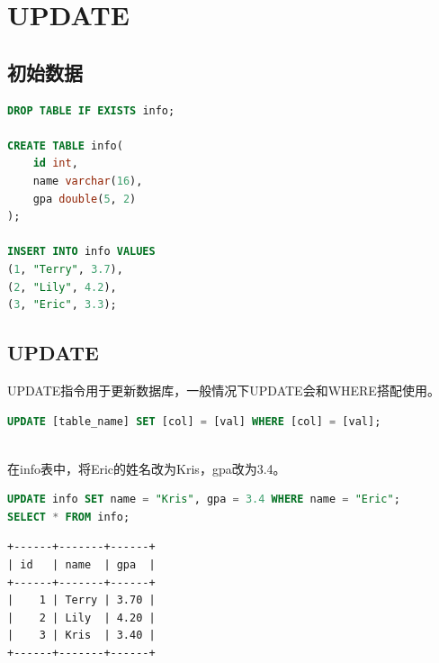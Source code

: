 \documentclass[12pt, openany, oneside]{book}
\begin{document}
\newpage

\chapter{UPDATE}

\section{初始数据}


\begin{lstlisting}[language=SQL]
DROP TABLE IF EXISTS info;

CREATE TABLE info(
    id int,
    name varchar(16),
    gpa double(5, 2)
);

INSERT INTO info VALUES
(1, "Terry", 3.7),
(2, "Lily", 4.2),
(3, "Eric", 3.3);
\end{lstlisting}

\vspace{0.5cm}

\section{UPDATE}

UPDATE指令用于更新数据库，一般情况下UPDATE会和WHERE搭配使用。

\vspace{-0.5cm}

\begin{lstlisting}[language=SQL]
UPDATE [table_name] SET [col] = [val] WHERE [col] = [val];
\end{lstlisting}

\vspace{0.5cm}

\\

在info表中，将Eric的姓名改为Kris，gpa改为3.4。

\vspace{-0.5cm}

\begin{lstlisting}[language=SQL]
UPDATE info SET name = "Kris", gpa = 3.4 WHERE name = "Eric";
SELECT * FROM info;
\end{lstlisting}

\begin{tcolorbox}
\begin{verbatim}
+------+-------+------+
| id   | name  | gpa  |
+------+-------+------+
|    1 | Terry | 3.70 |
|    2 | Lily  | 4.20 |
|    3 | Kris  | 3.40 |
+------+-------+------+
\end{verbatim}
\end{tcolorbox}
\end{document}
